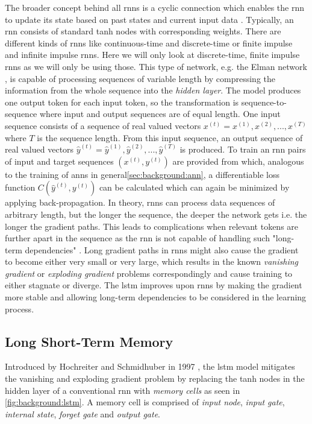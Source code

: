 The broader concept behind all \glspl{rnn} is a cyclic connection which enables the \gls{rnn} to update its state based on past states and current input data \cite{rnn_review}. Typically, an \gls{rnn} consists of standard tanh nodes with corresponding weights. There are different kinds of \glspl{rnn} like continuous-time and discrete-time or finite impulse and infinite impulse \glspl{rnn}. Here we will only look at discrete-time, finite impulse \glspl{rnn} as we will only be using those. This type of network, e.g. the Elman network \cite{rnn_elman}, is capable of processing sequences of variable length by compressing the information from the whole sequence into the \textit{hidden layer}.  The model produces one output token for each input token, so the transformation is sequence-to-sequence where input and output sequences are of equal length. One input sequence consists of a sequence of real valued vectors $x^{(t)} = x^{(1)}, x^{(2)}, ... , x^{(T)}$ where $T$ is the sequence length. From this input sequence, an output sequence of real valued vectors $\hat{y}^{(t)} = \hat{y}^{(1)}, \hat{y}^{(2)}, ... , \hat{y}^{(T)}$ is produced. To train an \gls{rnn} 
pairs of input and target sequences $(x^{(t)}, y^{(t)})$ are provided from which, analogous to the training of \glspl{ann} in general\ref{sec:background:ann}, a differentiable loss function $C(\hat{y}^{(t)}, y^{(t)})$ can be calculated which can again be minimized by applying back-propagation. In theory, \glspl{rnn} can process data sequences of arbitrary length, but the longer the sequence, the deeper the network gets i.e. the longer the gradient paths. This leads to complications when relevant tokens are further apart in the sequence as the \gls{rnn} is not capable of handling such "long-term dependencies" \cite{rnn_review}. Long gradient paths in \glspl{rnn} might also cause the gradient to become either very small or very large, which results in the known \textit{vanishing gradient} or \textit{exploding gradient} problems correspondingly and cause training to either stagnate or diverge. The \gls{lstm} improves upon \glspl{rnn} by making the gradient more stable and allowing long-term dependencies to be considered in the learning process.

\subsection{Long Short-Term Memory}

Introduced by Hochreiter and Schmidhuber in 1997 \cite{lstm_origin}, the \gls{lstm} model mitigates the vanishing and exploding gradient problem by replacing the tanh nodes in the hidden layer of a conventional \gls{rnn} with \textit{memory cells} as seen in \ref{fig:background:lstm}. 
A memory cell is comprised of \textit{input node}, \textit{input gate}, \textit{internal state}, \textit{forget gate} and \textit{output gate}. 

